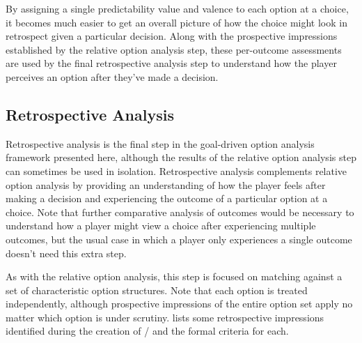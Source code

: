 By assigning a single predictability value and valence to each option at a choice, it becomes much easier to get an overall picture of how the choice might look in retrospect given a particular decision.
%
Along with the prospective impressions established by the relative option analysis step, these per-outcome assessments are used by the final retrospective analysis step to understand how the player perceives an option after they've made a decision.


\subsection{Retrospective Analysis}

\label{sec:cp-retrospective-analysis}


Retrospective analysis is the final step in the goal-driven option analysis framework presented here, although the results of the relative option analysis step can sometimes be used in isolation.
%
Retrospective analysis complements relative option analysis by providing an understanding of how the player feels after making a decision and experiencing the outcome of a particular option at a choice.
%
Note that further comparative analysis of outcomes would be necessary to understand how a player might view a choice after experiencing multiple outcomes, but the usual case in which a player only experiences a single outcome doesn't need this extra step.


As with the relative option analysis, this step is focused on matching against a set of characteristic option structures.
%
Note that each option is treated independently, although prospective impressions of the entire option set apply no matter which option is under scrutiny.
%
 lists some retrospective impressions identified during the creation of \dunyazad/ and the formal criteria for each.



